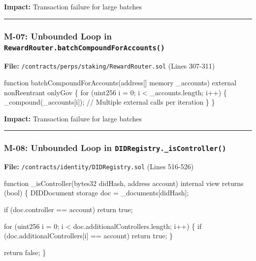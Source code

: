 \documentclass[
]{article}
\newenvironment{Shaded}{}{}
\newcommand{\NormalTok}[1]{#1}
\begin{document}
\textbf{Impact:} Transaction failure for large batches

\begin{center}\rule{0.5\linewidth}{0.5pt}\end{center}

\subsubsection{\texorpdfstring{M-07: Unbounded Loop in
\texttt{RewardRouter.batchCompoundForAccounts()}}{M-07: Unbounded Loop in RewardRouter.batchCompoundForAccounts()}}\label{m-07-unbounded-loop-in-rewardrouterbatchcompoundforaccounts}

\textbf{File:} \texttt{/contracts/perps/staking/RewardRouter.sol} (Lines
307-311)

\begin{Shaded}
\begin{Highlighting}[]
\NormalTok{function batchCompoundForAccounts(address[] memory \_accounts) external nonReentrant onlyGov \{}
\NormalTok{    for (uint256 i = 0; i \textless{} \_accounts.length; i++) \{}
\NormalTok{        \_compound(\_accounts[i]);  // Multiple external calls per iteration}
\NormalTok{    \}}
\NormalTok{\}}
\end{Highlighting}
\end{Shaded}

\textbf{Impact:} Transaction failure for large batches

\begin{center}\rule{0.5\linewidth}{0.5pt}\end{center}

\subsubsection{\texorpdfstring{M-08: Unbounded Loop in
\texttt{DIDRegistry.\_isController()}}{M-08: Unbounded Loop in DIDRegistry.\_isController()}}\label{m-08-unbounded-loop-in-didregistry_iscontroller}

\textbf{File:} \texttt{/contracts/identity/DIDRegistry.sol} (Lines
516-526)

\begin{Shaded}
\begin{Highlighting}[]
\NormalTok{function \_isController(bytes32 didHash, address account) internal view returns (bool) \{}
\NormalTok{    DIDDocument storage doc = \_documents[didHash];}

\NormalTok{    if (doc.controller == account) return true;}

\NormalTok{    for (uint256 i = 0; i \textless{} doc.additionalControllers.length; i++) \{}
\NormalTok{        if (doc.additionalControllers[i] == account) return true;}
\NormalTok{    \}}

\NormalTok{    return false;}
\NormalTok{\}}
\end{Highlighting}
\end{Shaded}
\end{document}
